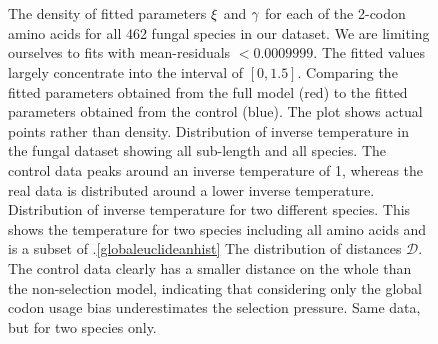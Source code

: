 \documentclass[a4paper,10pt]{paper}%
\begin{document}
\begin{figure}
\centering
{}
\\
\\
\caption{\protect{} The density of fitted parameters $\protect\xi$ and $\protect\gamma$  for each of the 2-codon amino acids for all 462 fungal species in our dataset. We are  limiting ourselves to fits with mean-residuals $<0.0009999$. The fitted values largely concentrate into the interval of $[0,1.5]$.  \protect{} Comparing the fitted parameters obtained from the full model (red) to the fitted parameters obtained from the control (blue). The plot shows actual points rather than density.  \protect{}  Distribution of inverse temperature in the fungal dataset showing all sub-length and all species. The control data peaks around an inverse temperature of 1, whereas the real data is distributed around a lower inverse temperature. \protect{} Distribution of inverse temperature for two different species. This shows  the temperature for two species including all amino acids and is a subset of \protect{}.\protect\ref{globaleuclideanhist} The distribution of distances $\mathcal D$. The  control data clearly has a smaller distance on the whole than the non-selection model, indicating that considering only the global codon usage bias underestimates the selection pressure.    \protect{} Same data, but for two species only. }
\label{fourspecies}
\label{fitresults}
\end{figure}
%
%
%
\end{document}
